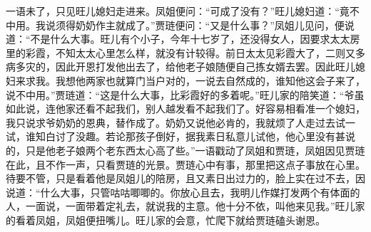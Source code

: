 一语未了，只见旺儿媳妇走进来。凤姐便问：“可成了没有？”旺儿媳妇道：“竟不中用。我说须得奶奶作主就成了。”贾琏便问：“又是什么事？”凤姐儿见问，便说道：“不是什么大事。旺儿有个小子，今年十七岁了，还没得女人，因要求太太房里的彩霞，不知太太心里怎么样，就没有计较得。前日太太见彩霞大了，二则又多病多灾的，因此开恩打发他出去了，给他老子娘随便自己拣女婿去罢。因此旺儿媳妇来求我。我想他两家也就算门当户对的，一说去自然成的，谁知他这会子来了，说不中用。”贾琏道：“这是什么大事，比彩霞好的多着呢。”旺儿家的陪笑道：“爷虽如此说，连他家还看不起我们，别人越发看不起我们了。好容易相看准一个媳妇，我只说求爷奶奶的恩典，替作成了。奶奶又说他必肯的，我就烦了人走过去试一试，谁知白讨了没趣。若论那孩子倒好，据我素日私意儿试他，他心里没有甚说的，只是他老子娘两个老东西太心高了些。”一语戳动了凤姐和贾琏，凤姐因见贾琏在此，且不作一声，只看贾琏的光景。贾琏心中有事，那里把这点子事放在心里。待要不管，只是看着他是凤姐儿的陪房，且又素日出过力的，脸上实在过不去，因说道：“什么大事，只管咕咕唧唧的。你放心且去，我明儿作媒打发两个有体面的人，一面说，一面带着定礼去，就说我的主意。他十分不依，叫他来见我。”旺儿家的看着凤姐，凤姐便扭嘴儿。旺儿家的会意，忙爬下就给贾琏磕头谢恩。


